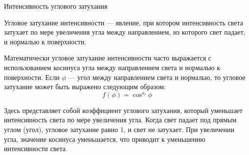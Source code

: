 \documentclass{beamer}
\begin{document}
	\begin{frame}{Интенсивность углового затухания}

		Угловое затухание интенсивности --- явление, при котором интенсивность света затухает по мере увеличения угла между направлением, из которого свет падает, и нормалью к поверхности. 

		Математически угловое затухание интенсивности часто выражается с использованием косинуса угла между направлением света и нормалью к поверхности. Если $\phi$ --- угол между направлением света и нормалью, то угловое затухание может быть выражено следующим образом:
		\[
			f(\phi) = \cos^{a_l} \phi
		\]


		Здесь представляет собой коэффициент углового затухания, который уменьшает интенсивность света по мере увеличения угла. Когда свет падает под прямым углом (угол), угловое затухание равно 1, и свет не затухает. При увеличении угла, значение косинуса уменьшается, что приводит к уменьшению интенсивности света.

		
	\end{frame}
\end{document}
